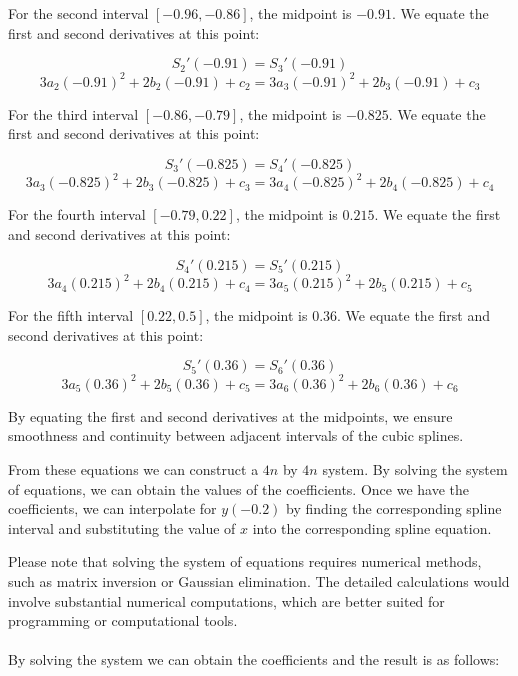 \documentclass[12pt, a4paper]{article}
\numberwithin{equation}{section}
\begin{document}
For the second interval \([-0.96, -0.86]\), the midpoint is \(-0.91\). We equate the first and second derivatives at this point:

\[S_2'(-0.91) = S_3'(-0.91)\]
\[3a_2(-0.91)^2 + 2b_2(-0.91) + c_2 = 3a_3(-0.91)^2 + 2b_3(-0.91) + c_3\]

For the third interval \([-0.86, -0.79]\), the midpoint is \(-0.825\). We equate the first and second derivatives at this point:

\[S_3'(-0.825) = S_4'(-0.825)\]
\[3a_3(-0.825)^2 + 2b_3(-0.825) + c_3 = 3a_4(-0.825)^2 + 2b_4(-0.825) + c_4\]

For the fourth interval \([-0.79, 0.22]\), the midpoint is \(0.215\). We equate the first and second derivatives at this point:

\[S_4'(0.215) = S_5'(0.215)\]
\[3a_4(0.215)^2 + 2b_4(0.215) + c_4 = 3a_5(0.215)^2 + 2b_5(0.215) + c_5\]

For the fifth interval \([0.22, 0.5]\), the midpoint is \(0.36\). We equate the first and second derivatives at this point:

\[S_5'(0.36) = S_6'(0.36)\]
\[3a_5(0.36)^2 + 2b_5(0.36) + c_5 = 3a_6(0.36)^2 + 2b_6(0.36) + c_6\]

By equating the first and second derivatives at the midpoints, we ensure smoothness and continuity between adjacent intervals of the cubic splines.

From these equations we can construct a $4n$ by $4n$ system. By solving the system of equations, we can obtain the values of the coefficients. Once we have the coefficients, we can interpolate for \(y(-0.2)\) by finding the corresponding spline interval and substituting the value of \(x\) into the corresponding spline equation.

Please note that solving the system of equations requires numerical methods, such as matrix inversion or Gaussian elimination. The detailed calculations would involve substantial numerical computations, which are better suited for programming or computational tools.
\\
\\
By solving the system we can obtain the coefficients and the result is as follows:
\\
\end{document}
